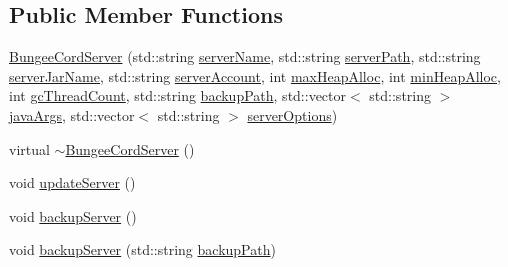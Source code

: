 \subsection*{Public Member Functions}
\begin{DoxyCompactItemize}
\item 
\hyperlink{class_minecraft_server_service_1_1_bungee_cord_server_a1b99966f745f910715dcf7c52839850b}{Bungee\+Cord\+Server} (std\+::string \hyperlink{class_minecraft_server_service_1_1_bungee_cord_server_affe74246ec8e01cadd21fb8ffe613934}{server\+Name}, std\+::string \hyperlink{class_minecraft_server_service_1_1_bungee_cord_server_a6d51d89bb1978039381a04af2f7b5880}{server\+Path}, std\+::string \hyperlink{class_minecraft_server_service_1_1_bungee_cord_server_a68a7e4caf06617af4713dd905ec3ce52}{server\+Jar\+Name}, std\+::string \hyperlink{class_minecraft_server_service_1_1_bungee_cord_server_a962f4683af0dcd67eadb62875d926142}{server\+Account}, int \hyperlink{class_minecraft_server_service_1_1_bungee_cord_server_acefb624eabfc4d7516329e28ccb2acde}{max\+Heap\+Alloc}, int \hyperlink{class_minecraft_server_service_1_1_bungee_cord_server_a9a888b11ba14938f093957e4108bd22b}{min\+Heap\+Alloc}, int \hyperlink{class_minecraft_server_service_1_1_bungee_cord_server_a993736356331c55b759b8af235c547de}{gc\+Thread\+Count}, std\+::string \hyperlink{class_minecraft_server_service_1_1_bungee_cord_server_aa087aafe4137b677f19f1757e088ea08}{backup\+Path}, std\+::vector$<$ std\+::string $>$ \hyperlink{class_minecraft_server_service_1_1_bungee_cord_server_a23dbf0f91c62b61730c643f93f9e1927}{java\+Args}, std\+::vector$<$ std\+::string $>$ \hyperlink{class_minecraft_server_service_1_1_bungee_cord_server_a3fc820aa9d0a5620f10c59e585690aa5}{server\+Options})
\item 
virtual \hyperlink{class_minecraft_server_service_1_1_bungee_cord_server_a6b01c6e4f7ee0544d27d8f09fa21f426}{$\sim$\+Bungee\+Cord\+Server} ()
\item 
void \hyperlink{class_minecraft_server_service_1_1_bungee_cord_server_a9b52175a0cd65b4ee1298c6b8f88a9a3}{update\+Server} ()
\item 
void \hyperlink{class_minecraft_server_service_1_1_bungee_cord_server_a775734dcde149377ccc8f83d206b7bf0}{backup\+Server} ()
\item 
void \hyperlink{class_minecraft_server_service_1_1_bungee_cord_server_a5e1a0b0e5be34b9e4be1ea3c97177d6c}{backup\+Server} (std\+::string \hyperlink{class_minecraft_server_service_1_1_bungee_cord_server_aa087aafe4137b677f19f1757e088ea08}{backup\+Path})
\item 

\end{DoxyCompactItemize}
